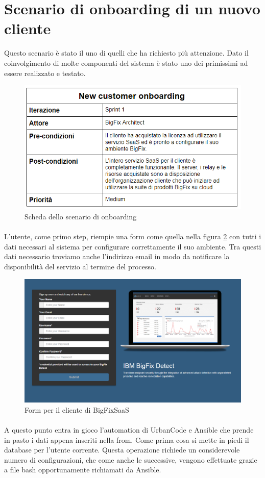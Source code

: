 \section{Scenario di onboarding di un nuovo cliente}
Questo scenario è stato il uno di quelli che ha richiesto più attenzione. Dato il coinvolgimento di molte componenti del sistema è stato uno dei primissimi ad essere realizzato e testato. 
\begin{figure}
	\centering
	\includegraphics[width=0.7\linewidth]{capitoli/imgs/onbordingScenarioScheda}
	\caption{Scheda dello scenario di onboarding}
	\label{fig:onbordingscenarioscheda}
\end{figure}
\paragraph{}
L'utente, come primo step, riempie una form come quella nella figura \ref{fig:saasform} con tutti i dati necessari al sistema per configurare correttamente il suo ambiente. Tra questi dati necessario troviamo anche l'indirizzo email in modo da notificare la disponibilità del servizio al termine del processo. 
\begin{figure}
	\centering
	\includegraphics[width=0.7\linewidth]{capitoli/imgs/saasForm}
	\caption{Form per il cliente di BigFixSaaS}
	\label{fig:saasform}
\end{figure}
\paragraph{}
A questo punto entra in gioco l'automation di UrbanCode e Ansible che prende in pasto i dati appena inseriti nella from. Come prima cosa si mette in piedi il database per l'utente corrente. Questa operazione richiede un considerevole numero di configurazioni, che come anche le successive, vengono effettuate grazie a file bash opportunamente richiamati da Ansible. 
